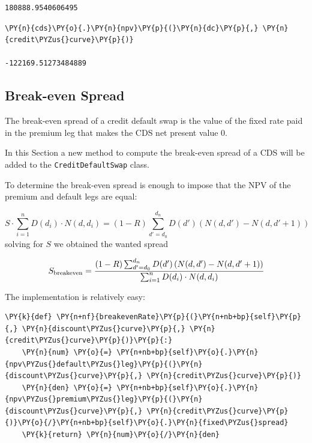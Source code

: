{\begin{tcolorbox}[breakable, size=fbox, boxrule=1pt, pad at break*=1mm,colback=cellbackground, colframe=cellborder]
\begin{Verbatim}[commandchars=\\\{\}]
180888.9540606495
\end{Verbatim}
\end{tcolorbox}

\begin{tcolorbox}[breakable, size=fbox, boxrule=1pt, pad at break*=1mm,colback=cellbackground, colframe=cellborder]
\begin{Verbatim}[commandchars=\\\{\}]
\PY{n}{cds}\PY{o}{.}\PY{n}{npv}\PY{p}{(}\PY{n}{dc}\PY{p}{,} \PY{n}{credit\PYZus{}curve}\PY{p}{)}

-122169.51273484889
\end{Verbatim}
\end{tcolorbox}
	
\subsection{Break-even Spread}
The break-even spread of a credit default swap is the value of the fixed rate paid in the premium leg that makes the CDS net present value 0.

In this Section a new method to compute the break-even spread of a CDS will be added to the \texttt{CreditDefaultSwap} class.

To determine the break-even spread is enough to impose that the NPV of the premium and default legs are equal:

\begin{equation}
S \cdot\sum_{i=1}^{n} D(d_i) \cdot N(d, d_i)
= (1-R) \sum_{d'=d_0}^{d_n} D(d') \left( N(d, d') - N(d, d'+1) \right)
\end{equation}
solving for $S$ we obtained the wanted spread

\begin{equation}
S_{\mathrm{breakeven}} = \cfrac{(1-R) \sum_{d'=d_0}^{d_n} D(d') \left( N(d, d') - N(d, d'+1) \right)}{\sum_{i=1}^{n} D(d_i) \cdot N(d, d_i)}
\end{equation}

The implementation is relatively easy:

\begin{tcolorbox}[breakable, size=fbox, boxrule=1pt, pad at break*=1mm,colback=cellbackground, colframe=cellborder]
\begin{Verbatim}[commandchars=\\\{\}]
  \PY{k}{def} \PY{n+nf}{breakevenRate}\PY{p}{(}\PY{n+nb+bp}{self}\PY{p}{,} \PY{n}{discount\PYZus{}curve}\PY{p}{,} \PY{n}{credit\PYZus{}curve}\PY{p}{)}\PY{p}{:}
    \PY{n}{num} \PY{o}{=} \PY{n+nb+bp}{self}\PY{o}{.}\PY{n}{npv\PYZus{}default\PYZus{}leg}\PY{p}{(}\PY{n}{discount\PYZus{}curve}\PY{p}{,} \PY{n}{credit\PYZus{}curve}\PY{p}{)}
    \PY{n}{den} \PY{o}{=} \PY{n+nb+bp}{self}\PY{o}{.}\PY{n}{npv\PYZus{}premium\PYZus{}leg}\PY{p}{(}\PY{n}{discount\PYZus{}curve}\PY{p}{,} \PY{n}{credit\PYZus{}curve}\PY{p}{)}\PY{o}{/}\PY{n+nb+bp}{self}\PY{o}{.}\PY{n}{fixed\PYZus{}spread}
    \PY{k}{return} \PY{n}{num}\PY{o}{/}\PY{n}{den}
\end{Verbatim}
\end{tcolorbox}

}
